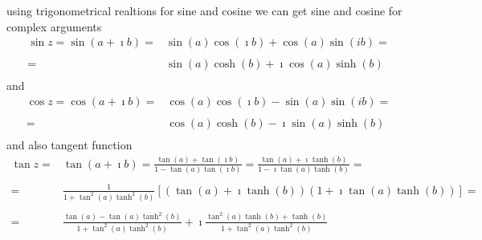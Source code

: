\documentclass[11pt,a4paper,openany,oneside]{extreport}
\begin{document}
using trigonometrical realtions for sine and cosine we can get sine and cosine for complex arguments
 \begin{displaymath}
  \begin{array}{rl}
  \sin{z} = \sin{(a+\imath b)} = & \sin{(a)}\cos{(\imath b)} + \cos{(a)}\sin{(ib)} = \\
   \ & \ \\
   =& \sin{(a)}\cosh{(b)} + \imath \cos{(a)}\sinh{(b)} \\
  \end{array}
 \end{displaymath}
and
 \begin{displaymath}
  \begin{array}{rl}
  \cos{z} = \cos{(a+\imath b)} = & \cos{(a)}\cos{(\imath b)} - \sin{(a)}\sin{(ib)} = \\
   \ & \ \\
   =&  \cos{(a)}\cosh{(b)} - \imath \sin{(a)}\sinh{(b)} \\
  \end{array}
 \end{displaymath}
and also tangent function
 \begin{displaymath}
  \begin{array}{rl}
  \tan{z} = &\tan{(a+\imath b)} = \frac{ \tan(a)+\tan(\imath b) }{ 1 - \tan(a)\tan(\imath b) } = \frac{ \tan(a)+\imath \tanh(b) }{ 1 - \imath \tan(a)\tanh(b) } = \\
   \ & \ \\
   = & \frac{1}{1 + \tan^2(a)\tanh^2(b) }\left[(\tan(a)+\imath \tanh(b))(1+\imath \tan(a)\tanh(b))  \right]=\\
   \ & \ \\
   = & \frac{\tan(a)- \tan(a)\tanh^2(b)}{1 + \tan^2(a)\tanh^2(b) } + \imath \frac{\tan^2(a)\tanh(b) + \tanh(b)}{1 + \tan^2(a)\tanh^2(b) } \\
  \end{array}
 \end{displaymath}
 
\end{document}
